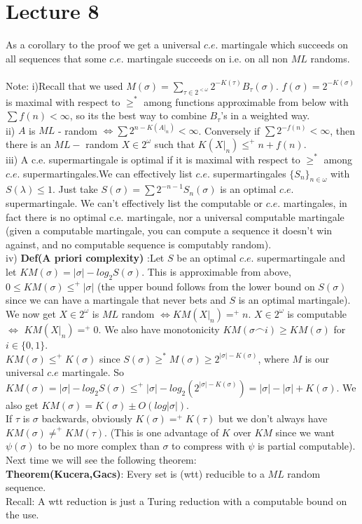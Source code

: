\documentclass{article}
\begin{document}
	\section{Lecture 8}
    As a corollary to the proof we get a universal $c.e.$ martingale which succeeds on all sequences that some $c.e.$ martingale succeeds on i.e. on all  non $ML$ randoms.\\
    \\
    Note: i)Recall that we used $M(\sigma) = \sum_{\tau \in 2^{<\omega}} 2^{-K(\tau)}
     B_\tau (\sigma)$. $f(\sigma) = 2^{-K(\sigma)}$ is maximal with respect to $\geq^*$ among functions approximable from below with $\sum f(n) < \infty$, so its the best way to combine $B_\tau$'s in a weighted way.\\
     ii) $A$ is $ML$ - random $\iff \sum 2^{n-K(A|_n)} < \infty$. Conversely if $\sum 2^{-f(n)} < \infty$, then there is an $ML-$ random $X \in 2^\omega$ such that $K(X|_n) \leq^+ n + f(n)$.\\
     iii) A c.e. supermartingale is optimal if it is maximal with respect to $\geq^*$ among $c.e. $ supermartingales.We can effectively list $c.e.$ supermartingales $\{S_n\}_{n\in \omega}$ with $S(\lambda) \leq 1$. Just take $S(\sigma) = \sum 2^{-n-1} S_n(\sigma)$ is an optimal $c.e. $ supermartingale. We can't effectively list the computable or $c.e.$ martingales, in fact there is no optimal c.e. martingale, nor a universal computable martingale (given a computable martingale, you can compute a sequence it doesn't win against, and no computable sequence is computably random).\\
     iv) \textbf{Def(A priori complexity)} :Let $S$ be an optimal $c.e.$ supermartingale and let $KM(\sigma) = |\sigma| - log_2 S(\sigma)$. This is approximable from above, $0\leq KM(\sigma) \leq^+ |\sigma| $ (the upper bound follows from the lower bound on $S(\sigma)$ since we can have a martingale that never bets and $S$ is an optimal martingale). We now get $X \in 2^\omega$ is $ML$ random $\iff KM(X|_n) =^+ n$. $X \in 2^\omega$ is computable $\iff$ $KM(X|_n) =^+ 0$. We also have monotonicity $KM(\sigma\frown i) \geq KM(\sigma)$ for $i\in \{0,1\}$. \\$KM(\sigma)\leq^+ K(\sigma)$ since $S(\sigma) \geq^* M(\sigma) \geq 2^{|\sigma|-K(\sigma)}$, where $M$ is our universal $c.e$ martingale. So $KM(\sigma) = |\sigma| - log_2 S(\sigma) \leq^+ |\sigma| - log_2(2^{|\sigma| - K(\sigma)}) = |\sigma| - |\sigma| + K(\sigma)$. We also get $KM(\sigma) = K(\sigma) \pm O(log|\sigma|)$. \\
     If $\tau$ is $\sigma$ backwards, obviously $K(\sigma) =^+ K(\tau)$ but we don't always have $KM(\sigma) \neq^+KM(\tau)$. (This is one advantage of $K$ over $KM$ since we want $\psi(\sigma)$ to be no more complex than $\sigma$ to compress with $\psi$ is partial computable).
     \\
     Next time we will see the following theorem:\\
     \textbf{Theorem(Kucera,Gacs)}: Every set is (wtt) reducible to a $ML$ random sequence.\\
     Recall: A wtt reduction is just a Turing reduction with a computable bound on the use.
     \newpage
\end{document}
